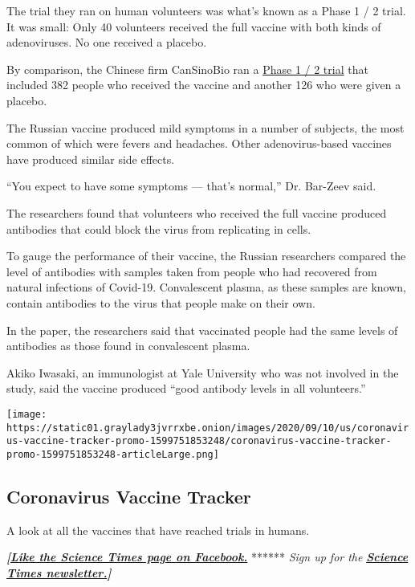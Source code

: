 The trial they ran on human volunteers was what's known as a Phase 1 / 2
trial. It was small: Only 40 volunteers received the full vaccine with
both kinds of adenoviruses. No one received a placebo.

By comparison, the Chinese firm CanSinoBio ran a
\href{https://www.thelancet.com/journals/lancet/article/PIIS0140-6736(20)31605-6/fulltext}{Phase
1 / 2 trial} that included 382 people who received the vaccine and
another 126 who were given a placebo.

The Russian vaccine produced mild symptoms in a number of subjects, the
most common of which were fevers and headaches. Other adenovirus-based
vaccines have produced similar side effects.

``You expect to have some symptoms --- that's normal,'' Dr. Bar-Zeev
said.

The researchers found that volunteers who received the full vaccine
produced antibodies that could block the virus from replicating in
cells.

To gauge the performance of their vaccine, the Russian researchers
compared the level of antibodies with samples taken from people who had
recovered from natural infections of Covid-19. Convalescent plasma, as
these samples are known, contain antibodies to the virus that people
make on their own.

In the paper, the researchers said that vaccinated people had the same
levels of antibodies as those found in convalescent plasma.

Akiko Iwasaki, an immunologist at Yale University who was not involved
in the study, said the vaccine produced ``good antibody levels in all
volunteers.''

\href{https://www.nytimes3xbfgragh.onion/interactive/2020/science/coronavirus-vaccine-tracker.html}{}

\texttt{[image: https://static01.graylady3jvrrxbe.onion/images/2020/09/10/us/coronavirus-vaccine-tracker-promo-1599751853248/coronavirus-vaccine-tracker-promo-1599751853248-articleLarge.png]}

\hypertarget{coronavirus-vaccine-tracker}{%
\subsection{Coronavirus Vaccine
Tracker}\label{coronavirus-vaccine-tracker}}

A look at all the vaccines that have reached trials in humans.

\textbf{\emph{{[}}\href{http://on.fb.me/1paTQ1h}{\emph{Like the Science
Times page on Facebook.}}} ****** \emph{\textbar{} Sign up for the}
\textbf{\href{http://nyti.ms/1MbHaRU}{\emph{Science Times
newsletter.}}\emph{{]}}}

